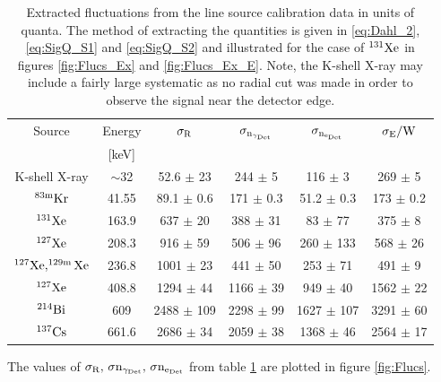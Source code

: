 \renewcommand{\baselinestretch}{1}
\small\normalsize
\begin{table}[h!]
\begin{center}
\begin{tabular}{|c|c|c|c|c|c|} \hline
Source & Energy & $\rm \sigma_R$ &  $\rm \sigma_{n_{\gamma_{Det}}}$ &  $\rm \sigma_{n_{e_{Det}}}$ & $\rm \sigma_E/W$  \\
& [keV] & & & & \\ [0.5ex] %
\hline
K-shell X-ray 				& $\sim$32 	 &  52.6 $\pm$ 23 		& 244 $\pm$ 5		& 116 $\pm$ 3 		 & 269 $\pm$ 5						\\ \hline
 $\rm ^{83m}Kr$ 				& 41.55		& 89.1	$\pm$ 0.6			& 171 $\pm$ 0.3		& 51.2 $\pm$	0.3		& 173 $\pm$ 0.2				\\ \hline
 $\rm ^{131}Xe$ 				& 163.9		& 637 $\pm$ 20			& 388	$\pm$ 31		& 83 $\pm$ 77		& 375 $\pm$ 8				\\ \hline
$\rm ^{127}Xe$ 				& 208.3 		& 916	$\pm$ 59			& 506	$\pm$ 96 		& 260 $\pm$ 133	 	& 568 $\pm$ 26			\\ \hline
$\rm ^{127}Xe, ^{129m}Xe$	 & 236.8		& 1001 $\pm$ 23			& 441	$\pm$ 50		& 253 $\pm$ 71		& 491 $\pm$ 9				\\ \hline
$\rm ^{127}Xe$			  	 & 408.8		& 1294 $\pm$ 44			& 1166	 $\pm$ 39		& 949 $\pm$ 40		& 1562 $\pm$ 22			\\ \hline
$\rm ^{214}Bi	$				& 609 			& 2488 $\pm$ 109		& 2298 $\pm$ 99		& 1627 $\pm$ 107	& 3291 $\pm$ 60				 \\ \hline
$\rm ^{137}Cs$				& 661.6		& 2686 $\pm$ 34			& 2059 $\pm$ 38		& 1368 $\pm$ 46		& 2564 $\pm$ 17				\\ [0.5ex] 
\hline
\end{tabular}
\caption{ Extracted fluctuations from the line source calibration data in units of quanta. The method of extracting the quantities is given in \ref{eq:Dahl_2}, \ref{eq:SigQ_S1} and \ref{eq:SigQ_S2} and illustrated for the case of  $\rm ^{131}Xe$ in figures \ref{fig:Flucs_Ex} and \ref{fig:Flucs_Ex_E}. Note, the K-shell X-ray may include a fairly large systematic as no radial cut was made in order to observe the signal near the detector edge.}
\label{table:Line_Data}
\end{center}
\end{table}
\renewcommand{\baselinestretch}{2}
\small\normalsize

\noindent The values of $\rm \sigma_R, \, \sigma n_{\gamma_{Det}}, \,\sigma n_{e_{Det}} $ from table \ref{table:Line_Data} are plotted in figure \ref{fig:Flucs}.

